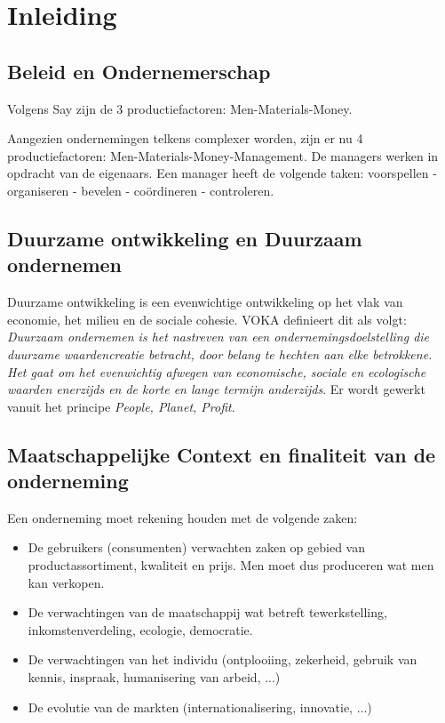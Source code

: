 \documentclass[../../samenvatting.tex]{subfiles}
\begin{document}
\section{Inleiding}
\subsection{Beleid en Ondernemerschap}
Volgens Say zijn de 3 productiefactoren: Men-Materials-Money.

Aangezien ondernemingen telkens complexer worden, zijn er nu 4 productiefactoren: Men-Materials-Money-Management. De managers werken in opdracht van de eigenaars. Een manager heeft de volgende taken: voorspellen - organiseren - bevelen - coördineren - controleren.


\subsection{Duurzame ontwikkeling en Duurzaam ondernemen}
Duurzame ontwikkeling is een evenwichtige ontwikkeling op het vlak van economie, het milieu en de sociale cohesie. VOKA definieert dit als volgt: \emph{Duurzaam ondernemen is het nastreven van een ondernemingsdoelstelling die duurzame waardencreatie betracht, door belang te hechten aan elke betrokkene. Het gaat om het evenwichtig afwegen van economische, sociale en ecologische waarden enerzijds en de korte en lange termijn anderzijds}. Er wordt gewerkt vanuit het principe \emph{People, Planet, Profit}.

\subsection{Maatschappelijke Context en finaliteit van de onderneming}
Een onderneming moet rekening houden met de volgende zaken:
\begin{itemize}
    \item De gebruikers (consumenten) verwachten zaken op gebied van productassortiment, kwaliteit en prijs. Men moet dus produceren wat men kan verkopen.
    \item De verwachtingen van de maatschappij wat betreft tewerkstelling, inkomstenverdeling, ecologie, democratie.
    \item De verwachtingen van het individu (ontplooiing, zekerheid, gebruik van kennis, inspraak, humanisering van arbeid, ...)
    \item De evolutie van de markten (internationalisering, innovatie, ...)
\end{itemize}
\end{document}
